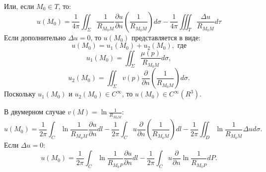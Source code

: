 \documentclass[11pt]{article}
\begin{document}
Или, если $M_0 \in T$, то:
\begin{equation}
u(M_0) = \frac1{4\pi}\iint_{\Sigma}\frac1{R_{M_0M}}\frac{\partial u}{\partial n}\left(\frac1{R_{M_0M}}\right)d\sigma -
\frac1{4\pi}\iiint_T\frac{\Delta u}{R_{M_0M}}d\tau
\end{equation}
Если дополнительно $\Delta u = 0$, то $u(M_0)$ представляется в виде:
\begin{equation}
u(M_0) = u_1(M_0) + u_2(M_0), \text{ где}
\end{equation}
\begin{equation}
u_1(M_0) = \iint_{\Sigma}\frac{\mu(p)}{R_{M_0M}}d\sigma,
\end{equation}
\begin{equation}
u_2(M_0) = \iint_{\Sigma}v(p)\frac{\partial}{\partial n}\left(\frac1{R_{M_0M}}\right)d\sigma.
\end{equation}
Поскольку $u_1(M_0)$ и $u_2(M_0) \in C^{\infty}$, то $u(M_0) \in C^{\infty}(R^3)$.

В двумерном случае $v(M) = \ln\frac1{R_{M_0M}}$:
\begin{equation}
u(M_0) = \frac1{2\pi}\int_C\ln\frac1{R_{M_0M}}\frac{\partial u}{\partial n}dl -
\frac1{2\pi}\int_Cu\frac{\partial}{\partial n}\left(\frac1{R_{M_0M}}\right)dl -
\frac1{2\pi}\iint_D\ln\frac1{R_{M_0M}}\Delta ud\sigma.
\end{equation}
Если $\Delta u = 0$:
\begin{equation}
u(M_0) = \frac1{2\pi}\int_C\ln\frac1{R_{M_0P}}\frac{\partial u}{\partial n}dl -
\frac1{2\pi}\int_Cu\frac{\partial}{\partial n}\ln\frac1{R_{M_0P}}dP.
\end{equation}
\end{document}
